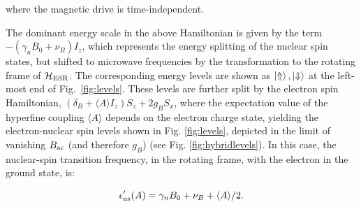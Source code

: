 where the magnetic drive is time-independent. 

The dominant energy scale in the above Hamiltonian is given by the term $-(\gamma_nB_0+\nu_B)I_z$, which represents the energy splitting of the nuclear spin states, but shifted to microwave frequencies by the transformation to the rotating frame of $\mathcal{H}_{\rm ESR}$. The corresponding energy levels are shown as $\ket{\Uparrow}, \ket{\Downarrow}$ at the left-most end of Fig.~\ref{fig:levels}. These levels are further split by the electron spin Hamiltonian, $\left(\delta_B+\langle A\rangle I_z\right)S_z+2g_BS_x$, where the expectation value of the hyperfine coupling $\langle A\rangle$ depends on the electron charge state, yielding the electron-nuclear spin levels shown in Fig. \ref{fig:levels}, depicted in the limit of vanishing $B_{\rm ac}$ (and therefore $g_B$) (see Fig. \ref{fig:hybridlevels}). In this case, the nuclear-spin transition frequency, in the rotating frame, with the electron in the ground state, is:

\begin{equation} \label{eq:e_ns}
\epsilon'_{\rm ns}(A) = \gamma_nB_0 + \nu_B + \langle A\rangle/2.
\end{equation}

